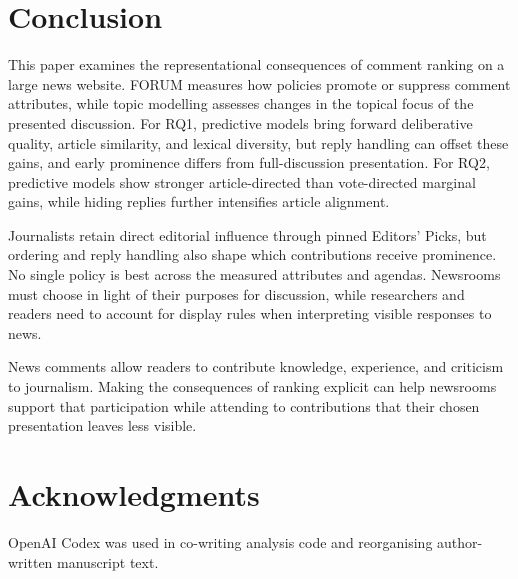 \section{Conclusion}
This paper examines the representational consequences of comment ranking on a large news website. FORUM measures how policies promote or suppress comment attributes, while topic modelling assesses changes in the topical focus of the presented discussion. For RQ1, predictive models bring forward deliberative quality, article similarity, and lexical diversity, but reply handling can offset these gains, and early prominence differs from full-discussion presentation. For RQ2, predictive models show stronger article-directed than vote-directed marginal gains, while hiding replies further intensifies article alignment.

Journalists retain direct editorial influence through pinned Editors' Picks, but ordering and reply handling also shape which contributions receive prominence. No single policy is best across the measured attributes and agendas. Newsrooms must choose in light of their purposes for discussion, while researchers and readers need to account for display rules when interpreting visible responses to news.

News comments allow readers to contribute knowledge, experience, and criticism to journalism. Making the consequences of ranking explicit can help newsrooms support that participation while attending to contributions that their chosen presentation leaves less visible.

\section*{Acknowledgments}
OpenAI Codex was used in co-writing analysis code and reorganising author-written manuscript text.
